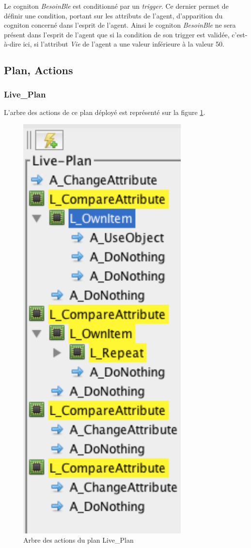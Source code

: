 \documentclass[a4paper,oneside,12 pt]{article}
\begin{document}
Le cogniton \textit{BesoinBle} est conditionné par un \textit{trigger}. Ce dernier permet de définir une condition, portant sur les attributs de l'agent, d'apparition du cogniton concerné dans l'esprit de l'agent. Ainsi le cogniton \textit{BesoinBle} ne sera présent dans l'esprit de l'agent 
que si la condition de son trigger est validée, c'est-à-dire ici,  si l'attribut \textit{Vie} de l'agent a une valeur inférieure à la valeur 50.

\subsection{Plan, Actions}
\subsubsection{Live\_Plan}
L'arbre des actions de ce plan déployé est représenté sur la figure \ref{PL2}.
\begin{figure}[!ht]
\begin{center}
\includegraphics[scale=0.5]{LivePlan2.pdf}
\caption[PL2]{Arbre des actions du plan Live\_Plan \\}
\label{PL2}
\end{center}
\end{figure} 
\end{document}
